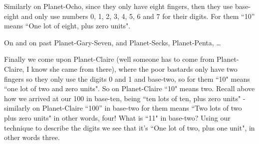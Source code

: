 \documentclass{article}
\begin{document}
Similarly on Planet-Ocho, since they only have eight fingers,
then they use base-eight and only use numbers 0, 1,
2, 3, 4, 5, 6 and 7 for their digits. For them ``10''
means ``One lot of eight, plus zero units".

On and on past Planet-Gary-Seven, and Planet-Secks, Planet-Penta, \dots{}

Finally we come upon Planet-Claire (well someone
has to come from Planet-Claire,
I know she came from there),
where the poor bastards only have two fingers
so they only use the digits 0 and 1 and base-two,
so for them ``10" means ``one lot of two and zero units".
So on Planet-Claire ``10" means two.
Recall above how we arrived at our 100 in base-ten,
being ``ten lots of ten,
plus zero units" - similarly on Planet-Claire ``100''
in base-two for them means ``Two lots of two plus zero units" in other words,
four! What is ``11" in base-two? Using our technique to
describe the digits we see that it's ``One lot of two, plus one unit",
in other words three.
\end{document}
